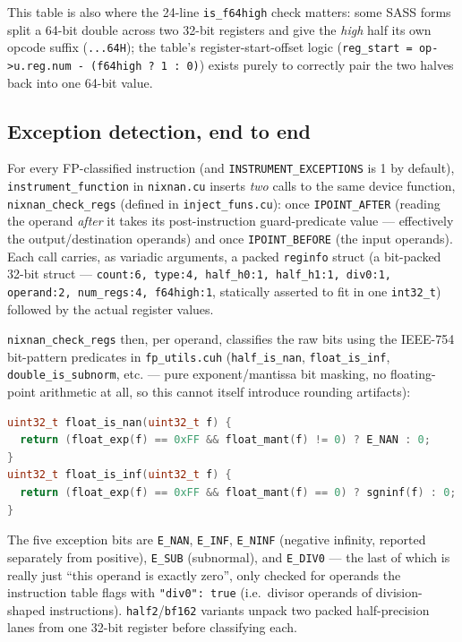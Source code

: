 \documentclass[11pt]{article}
\begin{document}
This table is also where the 24-line \texttt{is\_f64high} check matters:
some SASS forms split a 64-bit double across two 32-bit registers and
give the \emph{high} half its own opcode suffix (\texttt{...64H}); the
table's register-start-offset logic (\texttt{reg\_start = op->u.reg.num -
(f64high ? 1 : 0)}) exists purely to correctly pair the two halves back
into one 64-bit value.

\subsection{Exception detection, end to end}
\label{sec:exceptions}

For every FP-classified instruction (and \texttt{INSTRUMENT\_EXCEPTIONS} is
1 by default), \texttt{instrument\_function} in \texttt{nixnan.cu} inserts
\emph{two} calls to the same device function, \texttt{nixnan\_check\_regs}
(defined in \texttt{inject\_funs.cu}): once \texttt{IPOINT\_AFTER} (reading
the operand \emph{after} it takes its post-instruction guard-predicate
value --- effectively the output/destination operands) and once
\texttt{IPOINT\_BEFORE} (the input operands). Each call carries, as
variadic arguments, a packed \texttt{reginfo} struct (a bit-packed 32-bit
struct --- \texttt{count:6, type:4, half\_h0:1, half\_h1:1, div0:1,
operand:2, num\_regs:4, f64high:1}, statically asserted to fit in one
\texttt{int32\_t}) followed by the actual register values.

\texttt{nixnan\_check\_regs} then, per operand, classifies the raw bits
using the IEEE-754 bit-pattern predicates in \texttt{fp\_utils.cuh}
(\texttt{half\_is\_nan}, \texttt{float\_is\_inf}, \texttt{double\_is\_subnorm},
etc. --- pure exponent/mantissa bit masking, no floating-point arithmetic
at all, so this cannot itself introduce rounding artifacts):

\begin{lstlisting}[language=C++]
uint32_t float_is_nan(uint32_t f) {
  return (float_exp(f) == 0xFF && float_mant(f) != 0) ? E_NAN : 0;
}
uint32_t float_is_inf(uint32_t f) {
  return (float_exp(f) == 0xFF && float_mant(f) == 0) ? sgninf(f) : 0;
}
\end{lstlisting}

The five exception bits are \texttt{E\_NAN}, \texttt{E\_INF},
\texttt{E\_NINF} (negative infinity, reported separately from positive),
\texttt{E\_SUB} (subnormal), and \texttt{E\_DIV0} --- the last of which is
really just ``this operand is exactly zero'', only checked for operands
the instruction table flags with \texttt{"div0": true} (i.e.\ divisor
operands of division-shaped instructions). \texttt{half2}/\texttt{bf162}
variants unpack two packed half-precision lanes from one 32-bit register
before classifying each.
\end{document}
